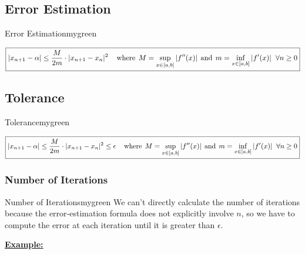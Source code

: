\subsection{Error Estimation}
\begin{prettyBox}{Error Estimation}{mygreen}
\begin{center}
    \(\boxed{|x_{n+1} - \alpha| \leq \dfrac{M}{2m} \cdot |x_{n+1} - x_n|^2 \hspace{0.4cm} \text{where} \hspace{0.15cm} M = \sup_{x\in [a,b]} |f''(x)| \hspace{0.15cm} \text{and} \hspace{0.15cm} m = \inf_{x\in [a,b]} |f'(x)| \hspace{0.2cm} \forall n\geq 0 }\)
\end{center}
\end{prettyBox}

\vspace{0.5cm}

\subsection{Tolerance}
\begin{prettyBox}{Tolerance}{mygreen}
\begin{center}
    \(\boxed{|x_{n+1} - \alpha| \leq \dfrac{M}{2m} \cdot |x_{n+1} - x_n|^2  \leq \epsilon \hspace{0.4cm} \text{where} \hspace{0.15cm} M = \sup_{x\in [a,b]} |f''(x)| \hspace{0.15cm} \text{and} \hspace{0.15cm} m = \inf_{x\in [a,b]} |f'(x)| \hspace{0.2cm} \forall n\geq 0 }\)
\end{center}
\end{prettyBox}



\vspace{0.5cm}

\subsubsection{Number of Iterations}
\begin{prettyBox}{Number of Iterations}{mygreen}
We can’t directly calculate the number of iterations because the error‑estimation formula does not explicitly involve \(n\), 
 so we have to compute the error at each iteration until it is greater than \(\epsilon\).
\end{prettyBox}

\vspace{0.75cm}

\textbf{\underline{Example:}}
